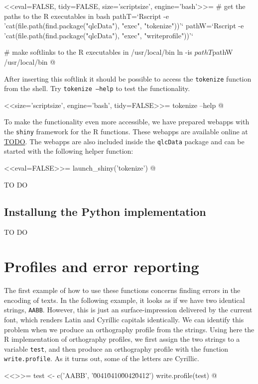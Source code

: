 <<eval=FALSE, tidy=FALSE, size='scriptsize', engine='bash'>>=
# get the paths to the R executables in bash
pathT=`Rscript -e 'cat(file.path(find.package("qlcData"), "exec", "tokenize"))'`
pathW=`Rscript -e 'cat(file.path(find.package("qlcData"), "exec", "writeprofile"))'`

# make softlinks to the R executables in /usr/local/bin
ln -is $pathT $pathW /usr/local/bin
@

After inserting this softlink it should be possible to access the
\texttt{tokenize} function from the shell. Try \texttt{tokenize --help} to test
the functionality.

<<size='scriptsize', engine='bash', tidy=FALSE>>=
tokenize --help
@

To make the functionality even more accessible, we have prepared webapps with 
the \texttt{shiny} framework for the R functions. These webapps are available 
online at \url{TODO}. The webapps are also included inside the \texttt{qlcData} 
package and can be started with the following helper function:

<<eval=FALSE>>=
launch_shiny('tokenize')
@

TO DO

\subsection*{Installung the Python implementation}

TO DO

\section{Profiles and error reporting}
\label{error-reporting}

The first example of how to use these functions concerns finding errors in the
encoding of texts. In the following example, it looks as if we have two
identical strings, \texttt{AABB}. However, this is just an surface-impression
delivered by the current font, which renders Latin and Cyrillic capitals
identically. We can identify this problem when we produce an orthography profile
from the strings. Using here the R implementation of orthography profiles, we
first assign the two strings to a variable \texttt{test}, and then produce an
orthography profile with the function \texttt{write.profile}. As it turns out,
some of the letters are Cyrillic.

<<>>=
test <- c('AABB', '\u0041\u0410\u0042\u0412')
write.profile(test)
@


